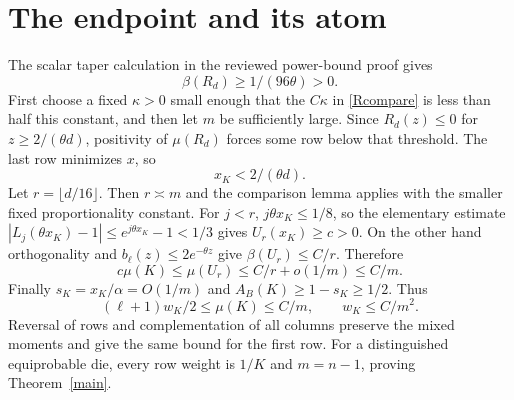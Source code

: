 \documentclass[11pt]{article}
\begin{document}
\section*{The endpoint and its atom}
The scalar taper calculation in the reviewed power-bound proof gives
\[
 \beta(R_d)\ge1/(96\theta)>0.
\]
First choose a fixed $\kappa>0$ small enough that the $C\kappa$ in
\eqref{Rcompare} is less than half this constant, and then let $m$
be sufficiently large. Since $R_d(z)\le0$ for $z\ge2/(\theta d)$,
positivity of $\mu(R_d)$ forces some row below that threshold.
The last row minimizes $x$, so
\[
 x_K<2/(\theta d).
\]
Let $r=\lfloor d/16\rfloor$. Then $r\asymp m$ and the comparison
lemma applies with the smaller fixed proportionality constant.
For $j<r$, $j\theta x_K\le1/8$, so the elementary estimate
$|L_j(\theta x_K)-1|\le e^{j\theta x_K}-1<1/3$ gives
$U_r(x_K)\ge c>0$. On the other hand orthogonality and
$b_\ell(z)\le2e^{-\theta z}$ give $\beta(U_r)\le C/r$.
Therefore
\[
 c\mu(K)\le\mu(U_r)\le C/r+o(1/m)\le C/m.
\]
Finally $s_K=x_K/\alpha=O(1/m)$ and
$A_B(K)\ge1-s_K\ge1/2$. Thus
\[
 (\ell+1)w_K/2\le\mu(K)\le C/m,
 \qquad w_K\le C/m^2.
\]
Reversal of rows and complementation of all columns preserve the
mixed moments and give the same bound for the first row. For a
distinguished equiprobable die, every row weight is $1/K$ and
$m=n-1$, proving Theorem~\ref{main}.
\end{document}
